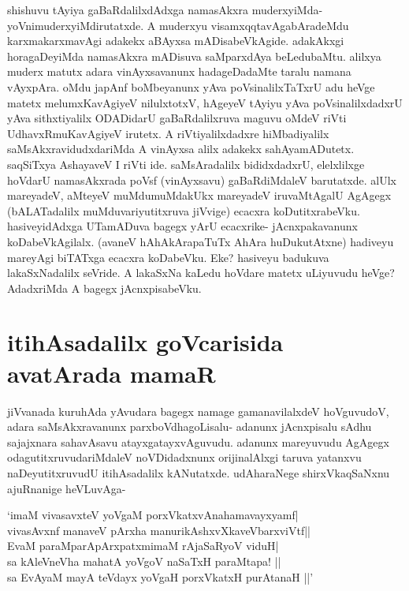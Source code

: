 shishuvu tAyiya gaBaRdalilxdAdxga namasAkxra muderxyiMda- yoVnimuderxyiMdirutatxde. A muderxyu visamxqqtavAgabAradeMdu karxmakarxmavAgi adakekx aBAyxsa mADisabeVkAgide. adakAkxgi horagaDeyiMda namasAkxra mADisuva saMparxdAya beLedubaMtu. alilxya muderx matutx adara vinAyxsavanunx hadageDadaMte taralu namana vAyxpAra. oMdu japAnf boMbeyanunx yAva poVsinalilxTaTxrU adu heVge matetx melumxKavAgiyeV nilulxtotxV, hAgeyeV tAyiyu yAva poVsinalilxdadxrU yAva sithxtiyalilx ODADidarU gaBaRdalilxruva maguvu oMdeV riVti UdhavxRmuKavAgiyeV irutetx. A riVtiyalilxdadxre hiMbadiyalilx saMsAkxravidudxdariMda A vinAyxsa alilx adakekx sahAyamADutetx. saqSiTxya AshayaveV I riVti ide. saMsAradalilx bididxdadxrU, elelxlilxge hoVdarU namasAkxrada poVsf (vinAyxsavu) gaBaRdiMdaleV barutatxde. alUlx mareyadeV, aMteyeV muMdumuMdakUkx mareyadeV iruvaMtAgalU AgAgegx (bALATadalilx muMduvariyutitxruva jiVvige) ecacxra koDutitxrabeVku. hasiveyidAdxga UTamADuva bagegx yArU ecacxrike- jAcnxpakavanunx koDabeVkAgilalx. (avaneV hAhAkArapaTuTx AhAra huDukutAtxne) hadiveyu mareyAgi biTATxga ecacxra koDabeVku. Eke? hasiveyu badukuva lakaSxNadalilx seVride. A lakaSxNa kaLedu hoVdare matetx uLiyuvudu heVge? AdadxriMda A bagegx jAcnxpisabeVku.

\section*{itihAsadalilx goVcarisida avatArada mamaR}

jiVvanada kuruhAda yAvudara bagegx namage gamanavilalxdeV hoVguvudoV, adara saMsAkxravanunx parxboVdhagoLisalu- adanunx jAcnxpisalu sAdhu sajajxnara sahavAsavu atayxgatayxvAguvudu. adanunx mareyuvudu AgAgegx odagutitxruvudariMdaleV noVDidadxnunx orijinalAlxgi taruva yatanxvu naDeyutitxruvudU itihAsadalilx kANutatxde. udAharaNege shirxVkaqSaNxnu ajuRnanige heVLuvAga-

\begin{shloka}
`imaM vivasavxteV yoVgaM porxVkatxvAnahamavayxyamf|\label{90}\\
vivasAvxnf manaveV pArxha manurikAshxvXkaveV\s barxviVtf||\\
EvaM paraMparApArxpatxmimaM rAjaSaRyoV viduH|\\
sa kAleVneVha mahatA yoVgoV naSaTxH paraMtapa! ||\\
sa EvA\s yaM mayA teV\s dayx yoVgaH porxVkatxH purAtanaH ||'
\end{shloka}

